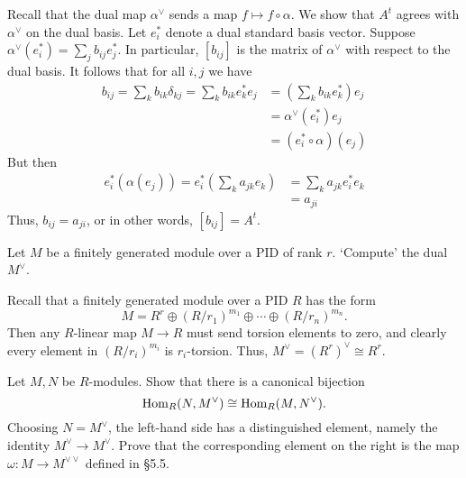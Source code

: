 \documentclass[../../master.tex]{subfiles}
\begin{document}
\begin{solution}
    Recall that the dual map $\alpha^{\vee}$ sends a map $f \mapsto f \circ \alpha$.
    We show that $A^{t}$ agrees with $\alpha^{\vee}$ on the dual basis.
    Let $e^{*}_i$ denote a dual standard basis vector.
    Suppose $\alpha^{\vee}(e^{*}_i) = \sum_{j} b_{ij} e^{*}_j$.
    In particular, $[b_{ij}]$ is the matrix of $\alpha^{\vee}$ with respect to the dual basis.
    It follows that for all $i, j$ we have
    \begin{align*}
        b_{ij} = \sum_{k} b_{ik} \delta_{kj} = \sum_{k} b_{ik} e^{*}_k e_j &= \left( \sum_{k} b_{ik} e^{*}_k \right) e_j \\
                                                                           &= \alpha^{\vee}(e^{*}_i) e_j \\
                                                                           &= (e^{*}_i \circ \alpha)(e_j)
    \end{align*}
    But then
    \begin{align*}
        e^{*}_i (\alpha(e_j)) = e^{*}_i \left( \sum_{k} a_{jk} e_k \right) &= \sum_{k} a_{jk} e^{*}_i e_k \\
                                                                           &= a_{ji}
    \end{align*}
    Thus, $b_{ij} = a_{ji}$, or in other words, $[b_{ij}] = A^{t}$.
\end{solution}

\begin{problem}
    Let $M$ be a finitely generated module over a PID of rank $r$.
    `Compute' the dual $M^{\vee}$.
\end{problem}

\begin{solution}
    Recall that a finitely generated module over a PID $R$ has the form
    \[
    M = R^{r} \oplus (R/r_1)^{m_1} \oplus \cdots \oplus (R/r_n)^{m_n}.
    \]
    Then any $R$-linear map $M \to R$ must send torsion elements to zero, and clearly every element in $(R/r_i)^{m_i}$ is $r_i$-torsion.
    Thus, $M^{\vee} = (R^{r})^{\vee} \cong R^{r}$.
\end{solution}

\begin{problem}
    Let $M, N$ be $R$-modules.
    Show that there is a canonical bijection
    \[
    \operatorname{Hom}_R(N, M^{\vee}) \cong \operatorname{Hom}_R(M, N^{\vee}).
    \]
    Choosing $N = M^{\vee}$, the left-hand side has a distinguished element, namely the identity $M^{\vee} \to M^{\vee}$.
    Prove that the corresponding element on the right is the map $\omega : M \to M^{\vee \vee}$ defined in \S 5.5.
\end{problem}
\end{document}
